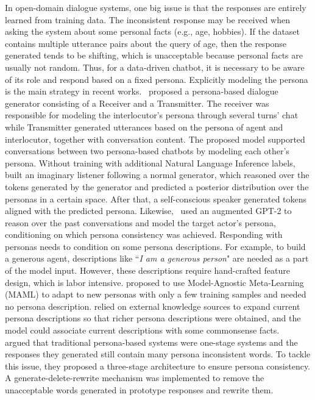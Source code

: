 \label{Speaker Consistency and Personality Response}
In open-domain dialogue systems, one big issue is that the responses are entirely learned from training data. The inconsistent response may be received when asking the system about some personal facts (e.g., age, hobbies). If the dataset contains multiple utterance pairs about the query of age, then the response generated tends to be shifting, which is unacceptable because personal facts are usually not random. Thus, for a data-driven chatbot, it is necessary to be aware of its role and respond based on a fixed persona. 
Explicitly modeling the persona is the main strategy in recent works.~ proposed a persona-based dialogue generator consisting of a Receiver and a Transmitter. The receiver was responsible for modeling the interlocutor's persona through several turns' chat while Transmitter generated utterances based on the persona of agent and interlocutor, together with conversation content. The proposed model supported conversations between two persona-based chatbots by modeling each other's persona. Without training with additional Natural Language Inference labels,~ built an imaginary listener following a normal generator, which reasoned over the tokens generated by the generator and predicted a posterior distribution over the personas in a certain space. After that, a self-conscious speaker generated tokens aligned with the predicted persona. Likewise,~ used an augmented GPT-2 to reason over the past conversations and model the target actor's persona, conditioning on which persona consistency was achieved. 
Responding with personas needs to condition on some persona descriptions. For example, to build a generous agent, descriptions like ``\textit{I am a generous person}" are needed as a part of the model input. However, these descriptions require hand-crafted feature design, which is labor intensive.  proposed to use Model-Agnostic Meta-Learning (MAML) to adapt to new personas with only a few training samples and needed no persona description.  relied on external knowledge sources to expand current persona descriptions so that richer persona descriptions were obtained, and the model could associate current descriptions with some commonsense facts. 
~ argued that traditional persona-based systems were one-stage systems and the responses they generated still contain many persona inconsistent words. To tackle this issue, they proposed a three-stage architecture to ensure persona consistency. A generate-delete-rewrite mechanism was implemented to remove the unacceptable words generated in prototype responses and rewrite them.

